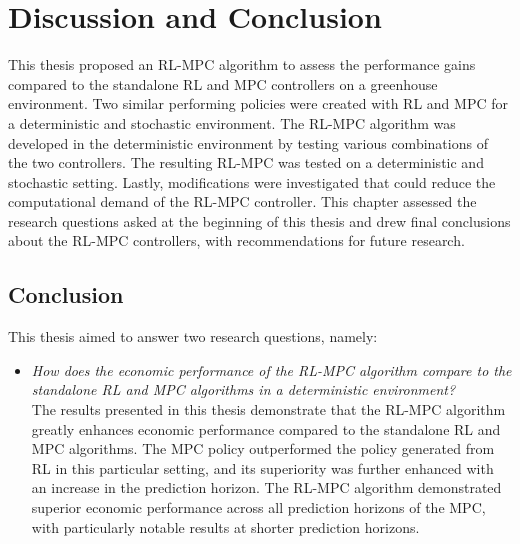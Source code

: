 \chapter{Discussion and Conclusion}
\label{chapter:conclusion}

This thesis proposed an RL-MPC algorithm to assess the performance gains compared to the standalone RL and MPC controllers on a greenhouse environment. Two similar performing policies were created with RL and MPC for a deterministic and stochastic environment. The RL-MPC algorithm was developed in the deterministic environment by testing various combinations of the two controllers. The resulting RL-MPC was tested on a deterministic and stochastic setting. Lastly, modifications were investigated that could reduce the computational demand of the RL-MPC controller. This chapter assessed the research questions asked at the beginning of this thesis and drew final conclusions about the RL-MPC controllers, with recommendations for future research.

\section{Conclusion}
This thesis aimed to answer two research questions, namely:

\begin{itemize}[itemsep=7pt] %
	\item \textit{How does the economic performance of the RL-MPC algorithm compare to the standalone RL and MPC algorithms in a deterministic environment?} 
	\\The results presented in this thesis demonstrate that the RL-MPC algorithm greatly enhances economic performance compared to the standalone RL and MPC algorithms. The MPC policy outperformed the policy generated from RL in this particular setting, and its superiority was further enhanced with an increase in the prediction horizon. The RL-MPC algorithm demonstrated superior economic performance across all prediction horizons of the MPC, with particularly notable results at shorter prediction horizons.
	
\end{itemize}

